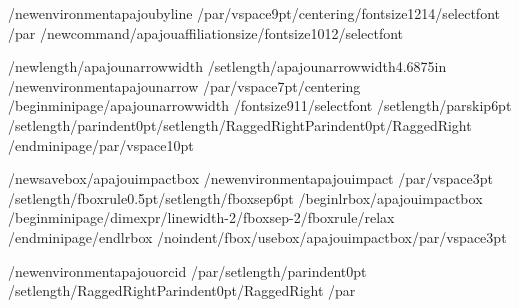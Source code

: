 /newenvironment{apajoubyline}
  {/par/vspace{9pt}/centering/fontsize{12}{14}/selectfont}
  {/par}
/newcommand{/apajouaffiliationsize}{/fontsize{10}{12}/selectfont}

/newlength{/apajounarrowwidth}
/setlength{/apajounarrowwidth}{4.6875in}
/newenvironment{apajounarrow}
  {/par/vspace{7pt}/centering
   /begin{minipage}{/apajounarrowwidth}%
   /fontsize{9}{11}/selectfont
   /setlength{/parskip}{6pt}%
   /setlength{/parindent}{0pt}/setlength{/RaggedRightParindent}{0pt}/RaggedRight}
  {/end{minipage}/par/vspace{10pt}}

/newsavebox{/apajouimpactbox}
/newenvironment{apajouimpact}
  {/par/vspace{3pt}%
   /setlength{/fboxrule}{0.5pt}/setlength{/fboxsep}{6pt}%
   /begin{lrbox}{/apajouimpactbox}%
   /begin{minipage}{/dimexpr/linewidth-2/fboxsep-2/fboxrule/relax}}
  {/end{minipage}/end{lrbox}%
   /noindent/fbox{/usebox{/apajouimpactbox}}/par/vspace{3pt}}

/newenvironment{apajouorcid}
  {/par/setlength{/parindent}{0pt}%
   /setlength{/RaggedRightParindent}{0pt}/RaggedRight}
  {/par}

